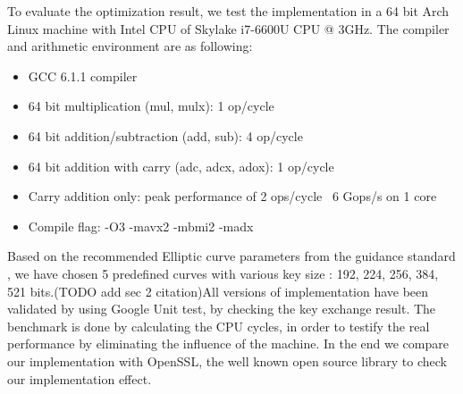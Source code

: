 To evaluate the optimization result, we test the implementation in a 64 bit Arch Linux machine with Intel CPU of Skylake i7-6600U CPU @ 3GHz. The compiler and arithmetic environment are as following: 

  \begin{itemize}
  \setlength\itemsep{0.5em}
  \item{GCC 6.1.1 compiler}
  \item{64 bit multiplication (mul, mulx): 1 op/cycle}
  \item{64 bit addition/subtraction (add, sub): 4 op/cycle}
  \item{64 bit addition with carry (adc, adcx, adox): 1 op/cycle}
  \item{Carry addition only: peak performance of 2 ops/cycle ~6 Gops/s on 1 core}
  \item{Compile flag: -O3 -mavx2 -mbmi2 -madx}
  \end{itemize}
  \setlength\itemsep{1.5em}
Based on the recommended Elliptic curve parameters from the guidance standard \cite{Brown:2009}, we have chosen 5 predefined curves with various key size : 192, 224, 256, 384, 521 bits.(TODO add sec 2 citation)All versions of implementation have been validated by using Google Unit test, by checking the key exchange result. The benchmark is done by calculating the CPU cycles, in order to testify the real performance by eliminating the influence of the machine. In the end we compare our implementation with OpenSSL, the well known open source library to check our implementation effect. 

